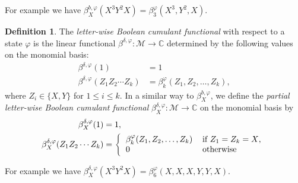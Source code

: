 \documentclass[12pt]{amsart}
\newcommand\IC{{\mathbb C}}
\newcommand{\alg}[1]{\mathcal{#1}}
\newcommand{\bbetas}[2]{\beta^{b,#1}_{#2}}
\theoremstyle{definition}
\newtheorem{definition}[theorem]{Definition}
\numberwithin{equation}{section}
\begin{document}
For example we have $\beta^{b,\varphi}_X(X^3Y^2X)=\beta_3^{\varphi}(X^3,Y^2,X)$.

\begin{definition}
  The   \emph{letter-wise Boolean cumulant functional}
  with respect to a state  $\varphi$
  is the linear functional
  $\beta^{\delta,\varphi}:\alg{M}\to \IC$
  determined by the following values on the monomial basis:
  \begin{equation*}
    \begin{aligned}
      \beta^{\delta,\varphi}(1) &= 1 \\
    \beta^{\delta,\varphi}(Z_1Z_2\cdots Z_k) &= \beta^\varphi_k(Z_1,Z_2,\ldots,Z_k),
    \end{aligned}
  \end{equation*}
  where $Z_i\in \{X,Y\}$ for $1\leq i\leq k$.
  In a similar way to $\bbetas{\varphi}{X}$, we define the
  \emph{partial letter-wise Boolean cumulant functional}
  $\beta^{\delta,\varphi}_X:\alg{M}\to\mathbb{C}$ on the monomial basis by
  \begin{align*}
    \beta^{\delta,\varphi}_X(1)
    &= 1,
    \\
    \beta^{\delta,\varphi}_X(Z_1Z_2\cdots Z_k)
    &= \left\{
      \begin{tabular}{ll}
        $\beta^{\varphi}_k(Z_1,Z_2,\ldots,Z_k)$ & if $Z_1=Z_k = X$,
        \\ $0$ & otherwise
      \end{tabular}\right.
  \end{align*}
\end{definition}
For example we have $\beta^{\delta,\varphi}_X(X^3Y^2X)=\beta_6^{\varphi}(X,X,X,Y,Y,X)$.
\end{document}
